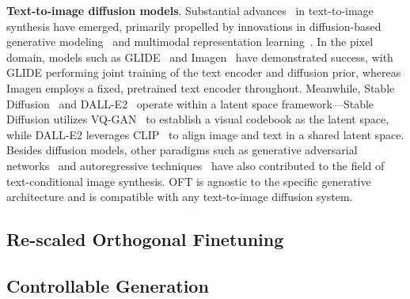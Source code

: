 \begin{itemize}[leftmargin=*,nosep]
\textbf{Text-to-image diffusion models}. Substantial advances~\cite{saharia2022photorealistic,ramesh2022hierarchical,rombach2022high,gu2022vector,nichol2022glide} in text-to-image synthesis have emerged, primarily propelled by innovations in diffusion-based generative modeling~\cite{ho2020denoising,song2021score,song2021denoising,dhariwal2021diffusion} and multimodal representation learning~\cite{su2020vlbert,lu2019vilbert,radford2021learning,wang2021simvlm,li2022blip,li2023blip,alayrac2022flamingo,schuhmann2022laion}. In the pixel domain, models such as GLIDE~\cite{nichol2022glide} and Imagen~\cite{saharia2022photorealistic} have demonstrated success, with GLIDE performing joint training of the text encoder and diffusion prior, whereas Imagen employs a fixed, pretrained text encoder throughout. Meanwhile, Stable Diffusion~\cite{rombach2022high} and DALL-E2~\cite{ramesh2022hierarchical} operate within a latent space framework—Stable Diffusion utilizes VQ-GAN~\cite{esser2021taming} to establish a visual codebook as the latent space, while DALL-E2 leverages CLIP~\cite{radford2021learning} to align image and text in a shared latent space. Besides diffusion models, other paradigms such as generative adversarial networks~\cite{reed2016generative,zhang2017stackgan,xu2018attngan,li2019controllable} and autoregressive techniques~\cite{ramesh2021zero,ding2021cogview,wu2022nuwa,yuscaling} have also contributed to the field of text-conditional image synthesis. OFT is agnostic to the specific generative architecture and is compatible with any text-to-image diffusion system.

\subsection{Re-scaled Orthogonal Finetuning}

\subsection{Controllable Generation}


\end{itemize}
